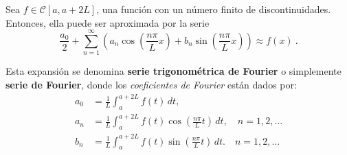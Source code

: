 \begin{defi} 
Sea $f \in \mathscr{C}[a, a+2L]$, una función con un número finito de discontinuidades. Entonces, ella puede ser aproximada por la serie 
\begin{equation}
    \frac{a_0}{2} + \sum_{n=1}^{\infty} \left( a_n \cos\left( \frac{n\pi}{L}x \right) + b_n \sin\left( \frac{n\pi}{L}x \right) \right) \approx f(x) \ . \label{FourierTrigo}
\end{equation}

Esta expansión se denomina \textbf{serie trigonométrica de Fourier} o simplemente \textbf{serie de Fourier}, donde los \textit{coeficientes de Fourier} están dados por:
\begin{align*}
    a_0 &= \frac{1}{L} \int_{a}^{a+2L} f(t) \,dt, \\
    a_n &= \frac{1}{L} \int_{a}^{a+2L} f(t) \cos\left( \frac{n\pi}{L}t \right) \,dt, \quad n = 1,2, \dots\\
    b_n &= \frac{1}{L} \int_{a}^{a+2L} f(t) \sin\left( \frac{n\pi}{L}t \right) \,dt. \quad n = 1,2, \dots
\end{align*}
\end{defi}







